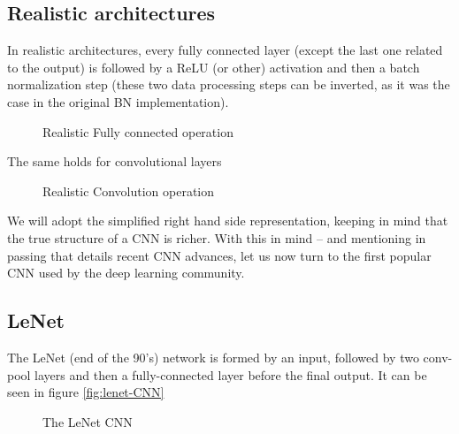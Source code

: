 \subsection{Realistic architectures}

In realistic architectures, every fully connected layer (except the last one related to the output) is followed by a ReLU (or other) activation and then a batch normalization step (these two data processing steps can be inverted, as it was the case in the original BN implementation).
\begin{figure}[H]
\begin{center}
\caption{Realistic Fully connected operation}
\end{center}
\end{figure}
 The same holds for convolutional layers
\begin{figure}[H]
\begin{center}
\caption{Realistic Convolution operation}
\end{center}
\end{figure}

We will adopt the simplified right hand side representation, keeping in mind that the true structure of a CNN is richer. With this in mind -- and mentioning in passing \cite{Gu2015RecentAI} that details recent CNN advances, let us now turn to the first popular CNN used by the deep learning community.

\subsection{LeNet}

The LeNet\cite{Lecun98gradient-basedlearning} (end of the 90's) network is formed by an input, followed by two conv-pool layers and then a fully-connected layer before the final output. It can be seen in figure \ref{fig:lenet-CNN}
\begin{figure}[H]
\begin{center}
\caption{The LeNet CNN}
\end{center}
\end{figure}

